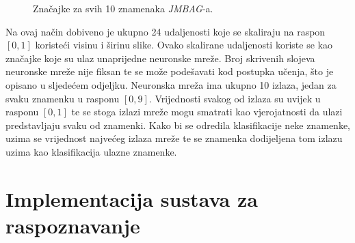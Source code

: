 \begin{figure}[htb]
    \centering
    \caption{Značajke za svih 10 znamenaka \emph{JMBAG}-a.}
    \label{fig:features-for-multiple-digits}
\end{figure}
Na ovaj način dobiveno je ukupno 24 udaljenosti koje se skaliraju na raspon $[0, 1]$ koristeći visinu i širinu slike.
Ovako skalirane udaljenosti koriste se kao značajke koje su ulaz unaprijedne neuronske mreže. Broj skrivenih slojeva
neuronske mreže nije fiksan te se može podešavati kod postupka učenja, što je opisano u sljedećem odjeljku. Neuronska
mreža ima ukupno 10 izlaza, jedan za svaku znamenku u rasponu $[0, 9]$. Vrijednosti svakog od izlaza su uvijek u rasponu
$[0, 1]$ te se stoga izlazi mreže mogu smatrati kao vjerojatnosti da ulazi predstavljaju svaku od znamenki. Kako bi se
odredila klasifikacije neke znamenke, uzima se vrijednost najvećeg izlaza mreže te se znamenka dodijeljena tom izlazu
uzima kao klasifikacija ulazne znamenke.


\section{Implementacija sustava za raspoznavanje}
\label{sec:implementacija-sustava-za-raspoznavanje}
